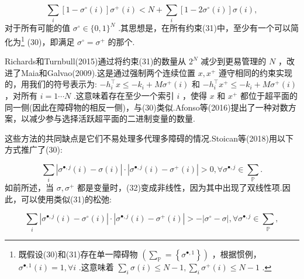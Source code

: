 \documentclass[10pt]{article}
\begin{document}
\begin{equation}
\mathop{\sum }\limits_{i}\left\lbrack  {1 - {\sigma }^{ \circ  }\left( i\right) }\right\rbrack  {\sigma }^{ + }\left( i\right)  < N + \mathop{\sum }\limits_{i}\left\lbrack  {1 - 2{\sigma }^{ \circ  }\left( i\right) }\right\rbrack  \sigma \left( i\right) ,
\end{equation}
对于所有可能的值 \({\sigma }^{ \circ  } \in  \{ 0,1{\} }^{N}\) .其思想是，在所有约束(31)中，至少有一个可以简化为\footnote{既假设(30)和(31)存在单一障碍物 \(\left( {{\sum }_{\mathbb{P}} = \left\{  {\sigma }^{\bullet ,1}\right\}  }\right)\) ，根据惯例， \({\sigma }^{\bullet ,1}\left( i\right)  = 1,\forall i\) .这意味着 \(\mathop{\sum }\limits_{i}\sigma \left( i\right)  \leq  N - 1,\mathop{\sum }\limits_{i}{\sigma }^{ + }\left( i\right)  \leq  N - 1\) .} (30)，即满足 \({\sigma }^{ \circ  } = {\sigma }^{ + }\) 的那个.

Richards和Turnbull(2015)通过将约束(31)的数量从 \({2}^{N}\) 减少到更易管理的 \(N\) ，改进了Maia和Galvao(2009).这是通过强制两个连续位置 \(x,{x}^{ + }\) 遵守相同的约束实现的，用我们的符号表示为: \(- {h}_{i}^{\top }x \leq   - {k}_{i} + M{\sigma }^{ + }\left( i\right)\) 和 \(- {h}_{i}^{\top }{x}^{ + } \leq   - {k}_{i} + M{\sigma }^{ + }\left( i\right)\) ，对所有 \(i = 1\cdots N\) .这意味着存在至少一个索引 \(i\) ，使得 \(x\) 和 \({x}^{ + }\) 都位于超平面的同一侧(因此在障碍物的相反一侧)，与(30)类似.Afonso等(2016)提出了一种对数方案，以减少参与选择活跃超平面的二进制变量的数量.

这些方法的共同缺点是它们不易处理多代理多障碍的情况.Stoican等(2018)用以下方式推广了(30):

\begin{equation}
\mathop{\sum }\limits_{i}\left| {{\sigma }^{\bullet ,j}\left( i\right)  - \sigma \left( i\right) }\right|  \cdot  \left| {{\sigma }^{\bullet ,j}\left( i\right)  - {\sigma }^{ + }\left( i\right) }\right|  > 0,\forall {\sigma }^{\bullet ,j} \in  {\sum }_{\mathbb{P}}.
\end{equation}
如前所述，当 \(\sigma ,{\sigma }^{ + }\) 都是变量时，(32)变成非线性，因为其中出现了双线性项.因此，可以使用类似(31)的松弛:

\begin{equation}
\mathop{\sum }\limits_{i}\left| {{\sigma }^{\bullet ,j}\left( i\right)  - {\sigma }^{ \circ  }\left( i\right) }\right|  \cdot  \left| {{\sigma }^{\bullet ,j}\left( i\right)  - {\sigma }^{ + }\left( i\right) }\right|  >  - \left| {{\sigma }^{ \circ  } - \sigma }\right| ,\forall {\sigma }^{\bullet ,j} \in  {\sum }_{\mathbb{P}},
\end{equation}
\end{document}
